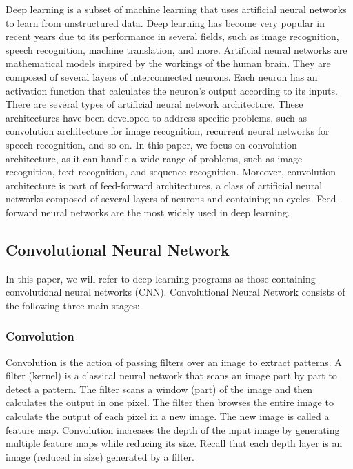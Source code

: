 \label{sec:introduction}

Deep learning is a subset of machine learning that uses artificial neural networks to learn from unstructured data. Deep learning has become very popular in recent years due to its performance in several fields, such as image recognition, speech recognition, machine translation, and more. Artificial neural networks are mathematical models inspired by the workings of the human brain. They are composed of several layers of interconnected neurons. Each neuron has an activation function that calculates the neuron's output according to its inputs. There are several types of artificial neural network architecture. These architectures have been developed to address specific problems, such as convolution architecture for image recognition, recurrent neural networks for speech recognition, and so on. In this paper, we focus on convolution architecture, as it can handle a wide range of problems, such as image recognition, text recognition, and sequence recognition. Moreover, convolution architecture is part of feed-forward architectures, a class of artificial neural networks composed of several layers of neurons and containing no cycles. Feed-forward neural networks are the most widely used in deep learning.\\


\subsection{Convolutional Neural Network}
In this paper, we will refer to deep learning programs as those containing convolutional neural networks (CNN). Convolutional Neural Network consists of the following three main stages:\\

\subsubsection*{Convolution}
Convolution is the action of passing filters over an image to extract patterns.
A filter (kernel) is a classical neural network that scans an image part by part to
detect a pattern. The filter scans a window (part) of the image and then
calculates the output in one pixel. The filter then browses the entire image to
calculate the output of each pixel in a new image. The new image is called a
feature map. Convolution increases the depth of the input image by generating
multiple feature maps while reducing its size. Recall that each depth layer is
an image (reduced in size) generated by a filter.\\

